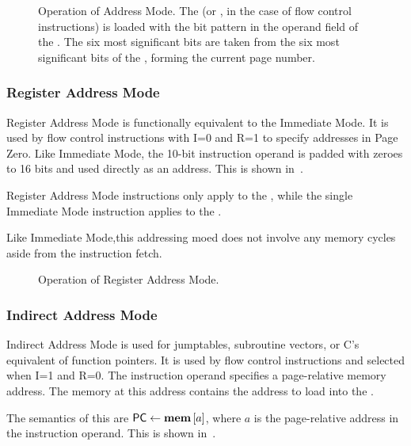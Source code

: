 \begin{figure}[htb]
 \centering
\caption[Address Mode]{\label{fig:address-mode} Operation of Address Mode. The
  \AC{} (or \PC{}, in the case of flow control instructions) is loaded with the
  bit pattern in the operand field of the \IR. The six most significant bits
  are taken from the six most significant bits of the \PC, forming the current
  page number.}
\end{figure}




\subsubsection{Register Address Mode}
\label{sec:register-address-mode}

Register Address Mode is functionally equivalent to the Immediate Mode. It is
used by flow control instructions with I=0 and R=1 to specify addresses in
\gls{Page Zero}. Like Immediate Mode, the 10-bit instruction operand is padded
with zeroes to 16 bits and used directly as an address. This is shown
in~.

Register Address Mode instructions only apply to the \PC, while the single
Immediate Mode instruction applies to the \AC.

Like Immediate Mode,this addressing moed does not involve any memory cycles
aside from the instruction fetch.

\begin{figure}[htb]
 \centering
 \caption[Register Address Mode]{\label{fig:register-address-mode} Operation
   of Register Address Mode.}
\end{figure}


\subsubsection{Indirect Address Mode}
\label{sec:indirect-address-mode}

Indirect Address Mode is used for jumptables, subroutine vectors, or C's
equivalent of function pointers. It is used by flow control instructions and
selected when I=1 and R=0. The instruction operand specifies a page-relative
memory address. The memory at this address contains the address to load into
the \PC.

The semantics of this are $\mbox{\PC}\eq\mem{a}$, where $a$ is the
page-relative address in the instruction operand. This is shown
in~.

